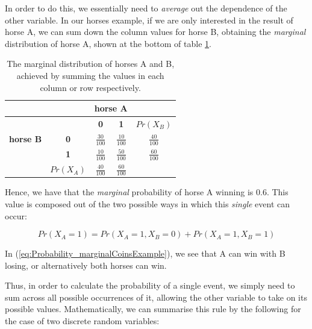 \documentclass[11pt,fullpage]{book}
\begin{document}
In order to do this, we essentially need to \textit{average} out the dependence of the other variable. In our horses example, if we are only interested in the result of horse A, we can sum down the column values for horse B, obtaining the \textit{marginal} distribution of horse A, shown at the bottom of table \ref{tab:Probability_coinsMarginal}.


\begin{table}[htbp]
  \centering
    \begin{tabular}{rrccr}
    \toprule
          &       & \multicolumn{2}{c}{\textbf{horse A}} &  \\
    \midrule
          &       & \textbf{0} & \textbf{1} & \multicolumn{1}{c}{\textbf{$Pr(X_B)$}} \\
    \multicolumn{1}{c}{\textbf{horse B}} & \multicolumn{1}{c}{\textbf{0}} & $\frac{30}{100}$   & $\frac{10}{100}$    & \multicolumn{1}{c}{\textbf{$\frac{40}{100}$ }} \\
    \multicolumn{1}{c}{} & \multicolumn{1}{c}{\textbf{1}} & $\frac{10}{100}$    & $\frac{50}{100}$    & \multicolumn{1}{c}{\textbf{$\frac{60}{100}$ }} \\
          & \multicolumn{1}{c}{\textbf{$Pr(X_A)$}} & \textbf{$\frac{40}{100}$ } & \textbf{$\frac{60}{100}$ } & \multicolumn{1}{c}{} \\
    \bottomrule
    \end{tabular}%
  \caption{The marginal distribution of horses A and B, achieved by summing the values in each column or row respectively.}\label{tab:Probability_coinsMarginal}%
\end{table}%

Hence, we have that the \textit{marginal} probability of horse A winning is 0.6. This value is composed out of the two possible ways in which this \textit{single} event can occur:

\begin{equation}\label{eq:Probability_marginalCoinsExample}
Pr(X_A=1) = Pr(X_A=1,X_B=0) + Pr(X_A=1,X_B=1)
\end{equation}

In (\ref{eq:Probability_marginalCoinsExample}), we see that A can win with B losing, or alternatively both horses can win.

Thus, in order to calculate the probability of a single event, we simply need to sum across all possible occurrences of it, allowing the other variable to take on its possible values. Mathematically, we can summarise this rule by the following for the case of two discrete random variables:
\end{document}
